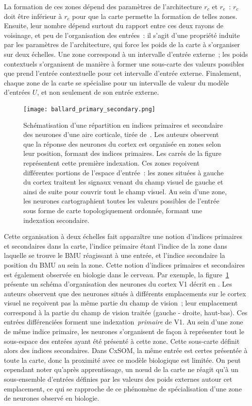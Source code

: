 \documentclass[../main]{subfiles}
\begin{document}
La formation de ces zones dépend des paramètres de l'architecture $r_c$ et $r_e$~: $r_c$ doit être inférieur à $r_e$ pour que la carte permette la formation de telles zones. 
Ensuite, leur nombre dépend surtout du rapport entre ces deux rayons de voisinage, et peu de l'organisation des entrées~: il s'agit d'une propriété induite par les paramètres de l'architecture, qui force les poids de la carte à s'organiser sur deux échelles.
Une zone correspond à un intervalle d'entrée externe~; les poids contextuels s'organisent de manière à former une sous-carte des valeurs possibles que prend l'entrée contextuelle pour cet intervalle d'entrée externe.
Finalement, chaque zone de la carte se spécialise pour un intervalle de valeur du modèle d'entrées $U$, et non seulement de son entrée externe.

\begin{figure}
	\centering\texttt{[image: ballard\_primary\_secondary.png]}
	\vspace{-0.5cm}
	\caption{Schématisation d'une répartition en indices primaires et secondaire des neurones d'une aire corticale, tirée de~\cite{ballard_cortical_1986}. 
	Les auteurs observent que la réponse des neurones du cortex est organisée en zones selon leur position, formant des indices primaires. Les carrés de la figure représentent cette première indexation.
	Ces zones reçoivent différentes portions de l'espace d'entrée~: les zones situées à gauche du cortex traitent les signaux venant du champ visuel de gauche et ainsi de suite pour couvrir tout le champ visuel.
	Au sein d'une zone, les neurones cartographient toutes les valeurs possibles de l'entrée sous forme de carte topologiquement ordonnée, formant une indexation secondaire. \label{fig:ballard}}
\end{figure}

Cette organisation à deux échelles fait apparaître une notion d'indices primaires et secondaires dans la carte, l'indice primaire étant l'indice de la zone dans laquelle se trouve le BMU réagissant à une entrée, et l'indice secondaire la position du BMU au sein la zone.
Cette notion d'indices primaires et secondaires est également observée en biologie dans le cerveau. 
Par exemple, la figure~\ref{fig:ballard} présente un schéma d'organisation des neurones du cortex V1 décrit en \cite{ballard_cortical_1986}.
Les auteurs observent que des neurones situés à différents emplacements sur le cortex visuel ne reçoivent pas la même partie du champ de vision~; leur emplacement correspond à la partie du champ de vision traitée (gauche - droite, haut-bas). Ces entrées différenciées forment une indexation~\emph{primaire} de V1. 
Au sein d'une zone de même indice primaire, les neurones s'organisent de façon à représenter tout le sous-espace des entrées ayant été présenté à cette zone. Cette sous-carte définit alors des indices secondaires.
Dans CxSOM, la même entrée est certes présentée à toute la carte, donc la proximité avec ce modèle biologique est limitée. On peut cependant noter qu'après apprentissage, un n\oe{}ud de la carte ne réagit qu'à un sous-ensemble d'entrées définies par les valeurs des poids externes autour cet emplacement, ce qui se rapproche de ce phénomène de spécialisation d'une zone de neurones observé en biologie.
\end{document}
